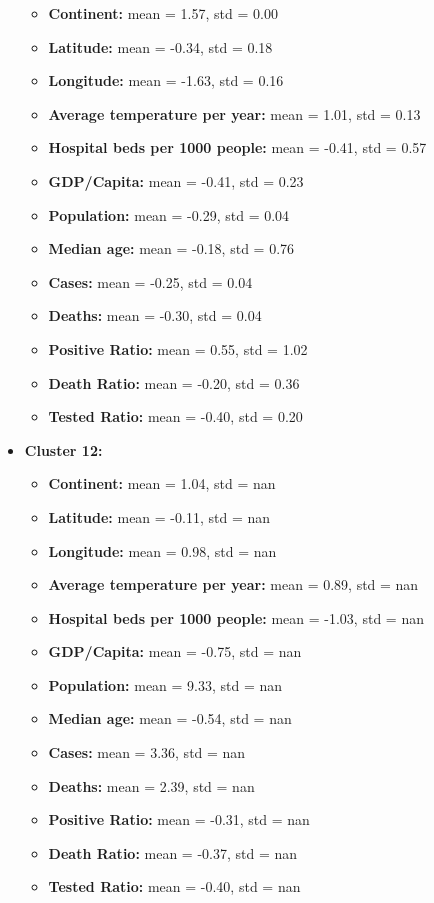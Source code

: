 \documentclass[12pt,a4paper]{article}
\begin{document}
\begin{itemize}
        \begin{itemize}
            \item \textbf{Continent:} mean = 1.57, std = 0.00
            \item \textbf{Latitude:} mean = -0.34, std = 0.18
            \item \textbf{Longitude:} mean = -1.63, std = 0.16
            \item \textbf{Average temperature per year:} mean = 1.01, std = 0.13
            \item \textbf{Hospital beds per 1000 people:} mean = -0.41, std = 0.57
            \item \textbf{GDP/Capita:} mean = -0.41, std = 0.23
            \item \textbf{Population:} mean = -0.29, std = 0.04
            \item \textbf{Median age:} mean = -0.18, std = 0.76
            \item \textbf{Cases:} mean = -0.25, std = 0.04
            \item \textbf{Deaths:} mean = -0.30, std = 0.04
            \item \textbf{Positive Ratio:} mean = 0.55, std = 1.02
            \item \textbf{Death Ratio:} mean = -0.20, std = 0.36
            \item \textbf{Tested Ratio:} mean = -0.40, std = 0.20
        \end{itemize}
    \item \textbf{Cluster 12:} 
        \begin{itemize}
            \item \textbf{Continent:} mean = 1.04, std = nan
            \item \textbf{Latitude:} mean = -0.11, std = nan
            \item \textbf{Longitude:} mean = 0.98, std = nan
            \item \textbf{Average temperature per year:} mean = 0.89, std = nan
            \item \textbf{Hospital beds per 1000 people:} mean = -1.03, std = nan
            \item \textbf{GDP/Capita:} mean = -0.75, std = nan
            \item \textbf{Population:} mean = 9.33, std = nan
            \item \textbf{Median age:} mean = -0.54, std = nan
            \item \textbf{Cases:} mean = 3.36, std = nan
            \item \textbf{Deaths:} mean = 2.39, std = nan
            \item \textbf{Positive Ratio:} mean = -0.31, std = nan
            \item \textbf{Death Ratio:} mean = -0.37, std = nan
            \item \textbf{Tested Ratio:} mean = -0.40, std = nan
        \end{itemize}
\end{itemize}
\end{document}
